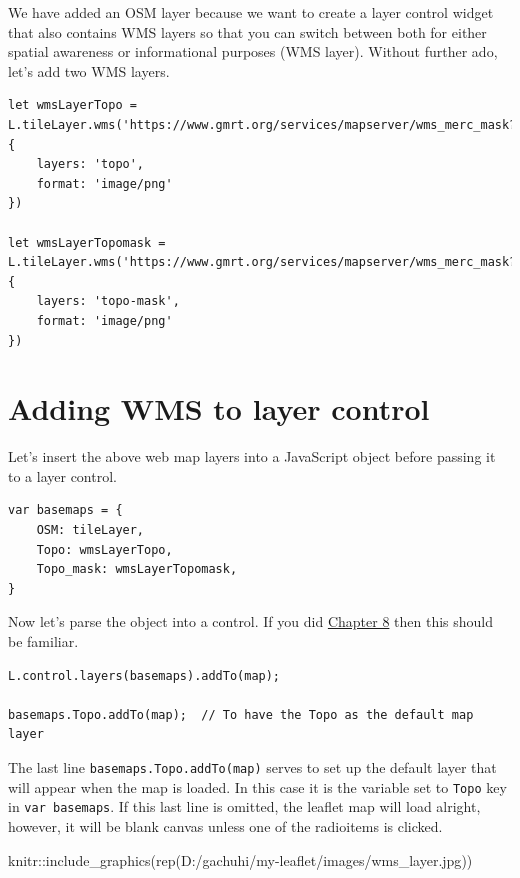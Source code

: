 \documentclass[
]{book}
\newenvironment{Shaded}{\begin{snugshade}}{\end{snugshade}}
\newcommand{\FunctionTok}[1]{\textcolor[rgb]{0.00,0.00,0.00}{#1}}
\newcommand{\NormalTok}[1]{#1}
\newcommand{\SpecialCharTok}[1]{\textcolor[rgb]{0.00,0.00,0.00}{#1}}
\newcommand{\StringTok}[1]{\textcolor[rgb]{0.31,0.60,0.02}{#1}}
\begin{document}
We have added an OSM layer because we want to create a layer control widget that also contains WMS layers so that you can switch between both for either spatial awareness or informational purposes (WMS layer). Without further ado, let's add two WMS layers.

\begin{verbatim}
let wmsLayerTopo = L.tileLayer.wms('https://www.gmrt.org/services/mapserver/wms_merc_mask?', {
    layers: 'topo',
    format: 'image/png'
})

let wmsLayerTopomask = L.tileLayer.wms('https://www.gmrt.org/services/mapserver/wms_merc_mask?', {
    layers: 'topo-mask',
    format: 'image/png'
})
\end{verbatim}

\hypertarget{adding-wms-to-layer-control}{%
\section{Adding WMS to layer control}\label{adding-wms-to-layer-control}}

Let's insert the above web map layers into a JavaScript object before passing it to a layer control.

\begin{verbatim}
var basemaps = {
    OSM: tileLayer,
    Topo: wmsLayerTopo,
    Topo_mask: wmsLayerTopomask,
}
\end{verbatim}

Now let's parse the object into a control. If you did \protect\hyperlink{layer-groups-and-controls}{Chapter 8} then this should be familiar.

\begin{verbatim}
L.control.layers(basemaps).addTo(map);

basemaps.Topo.addTo(map);  // To have the Topo as the default map layer
\end{verbatim}

The last line \texttt{basemaps.Topo.addTo(map)} serves to set up the default layer that will appear when the map is loaded. In this case it is the variable set to \texttt{Topo} key in \texttt{var\ basemaps}. If this last line is omitted, the leaflet map will load alright, however, it will be blank canvas unless one of the radioitems is clicked.

\begin{Shaded}
\begin{Highlighting}[]
\NormalTok{knitr}\SpecialCharTok{::}\FunctionTok{include\_graphics}\NormalTok{(}\FunctionTok{rep}\NormalTok{(}\StringTok{\textquotesingle{}D:/gachuhi/my{-}leaflet/images/wms\_layer.jpg\textquotesingle{}}\NormalTok{))}
\end{Highlighting}
\end{Shaded}
\end{document}
